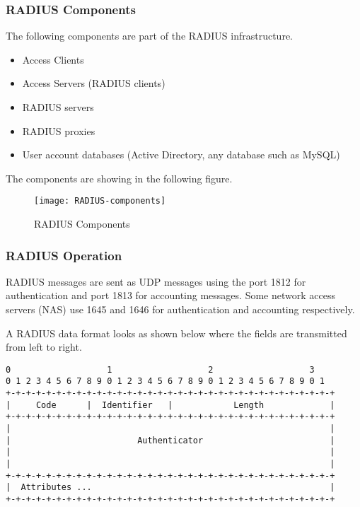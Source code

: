 \subsubsection{RADIUS Components \cite{RADIUS_components}} \label{RADIUS_components}
The following components are part of the RADIUS infrastructure.
\begin{itemize}
	\item Access Clients
	\item Access Servers (RADIUS clients)
	\item RADIUS servers
	\item RADIUS proxies
	\item User account databases (Active Directory, any database such as MySQL)
	
\end{itemize}
The components are showing in the following figure.

\begin{figure}[H]
	\centering
	\texttt{[image: RADIUS-components]}
	\caption {RADIUS Components \cite{RADIUS_components_img}}
	\label{fig:RADIUS_components_img}
	\vspace{-10pt}
\end{figure}
\subsubsection{RADIUS Operation \cite{RADIUS_components}} \label{RADIUS_Operations}
RADIUS messages are sent as UDP messages using the port 1812 for authentication and port 1813 for accounting messages. Some network access servers (NAS) use 1645 and 1646 for authentication and accounting respectively.

A RADIUS data format looks as shown below where the fields are transmitted from left to right.

\begin{lstlisting}
0                   1                   2                   3
0 1 2 3 4 5 6 7 8 9 0 1 2 3 4 5 6 7 8 9 0 1 2 3 4 5 6 7 8 9 0 1
+-+-+-+-+-+-+-+-+-+-+-+-+-+-+-+-+-+-+-+-+-+-+-+-+-+-+-+-+-+-+-+-+
|     Code      |  Identifier   |            Length             |
+-+-+-+-+-+-+-+-+-+-+-+-+-+-+-+-+-+-+-+-+-+-+-+-+-+-+-+-+-+-+-+-+
|                                                               |
|                         Authenticator                         |
|                                                               |
|                                                               |
+-+-+-+-+-+-+-+-+-+-+-+-+-+-+-+-+-+-+-+-+-+-+-+-+-+-+-+-+-+-+-+-+
|  Attributes ...												|
+-+-+-+-+-+-+-+-+-+-+-+-+-+-+-+-+-+-+-+-+-+-+-+-+-+-+-+-+-+-+-+-+

\end{lstlisting}


